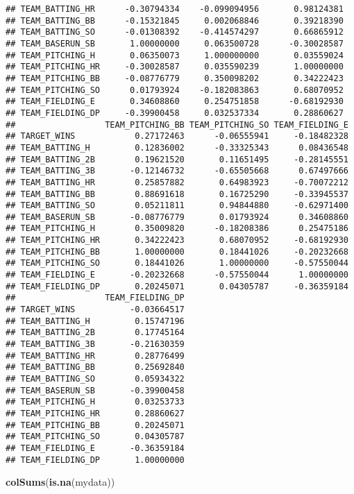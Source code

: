 \documentclass[
]{article}
\newenvironment{Shaded}{\begin{snugshade}}{\end{snugshade}}
\newcommand{\KeywordTok}[1]{\textcolor[rgb]{0.13,0.29,0.53}{\textbf{#1}}}
\newcommand{\NormalTok}[1]{#1}
\begin{document}
\begin{verbatim}
## TEAM_BATTING_HR      -0.30794334    -0.099094956       0.98124381
## TEAM_BATTING_BB      -0.15321845     0.002068846       0.39218390
## TEAM_BATTING_SO      -0.01308392    -0.414574297       0.66865912
## TEAM_BASERUN_SB       1.00000000     0.063500728      -0.30028587
## TEAM_PITCHING_H       0.06350073     1.000000000       0.03559024
## TEAM_PITCHING_HR     -0.30028587     0.035590239       1.00000000
## TEAM_PITCHING_BB     -0.08776779     0.350098202       0.34222423
## TEAM_PITCHING_SO      0.01793924    -0.182083863       0.68070952
## TEAM_FIELDING_E       0.34608860     0.254751858      -0.68192930
## TEAM_FIELDING_DP     -0.39900458     0.032537334       0.28860627
##                  TEAM_PITCHING_BB TEAM_PITCHING_SO TEAM_FIELDING_E
## TARGET_WINS            0.27172463      -0.06555941     -0.18482328
## TEAM_BATTING_H         0.12836002      -0.33325343      0.08436548
## TEAM_BATTING_2B        0.19621520       0.11651495     -0.28145551
## TEAM_BATTING_3B       -0.12146732      -0.65505668      0.67497666
## TEAM_BATTING_HR        0.25857882       0.64983923     -0.70072212
## TEAM_BATTING_BB        0.88691618       0.16725290     -0.33945537
## TEAM_BATTING_SO        0.05211811       0.94844880     -0.62971400
## TEAM_BASERUN_SB       -0.08776779       0.01793924      0.34608860
## TEAM_PITCHING_H        0.35009820      -0.18208386      0.25475186
## TEAM_PITCHING_HR       0.34222423       0.68070952     -0.68192930
## TEAM_PITCHING_BB       1.00000000       0.18441026     -0.20232668
## TEAM_PITCHING_SO       0.18441026       1.00000000     -0.57550044
## TEAM_FIELDING_E       -0.20232668      -0.57550044      1.00000000
## TEAM_FIELDING_DP       0.20245071       0.04305787     -0.36359184
##                  TEAM_FIELDING_DP
## TARGET_WINS           -0.03664517
## TEAM_BATTING_H         0.15747196
## TEAM_BATTING_2B        0.17745164
## TEAM_BATTING_3B       -0.21630359
## TEAM_BATTING_HR        0.28776499
## TEAM_BATTING_BB        0.25692840
## TEAM_BATTING_SO        0.05934322
## TEAM_BASERUN_SB       -0.39900458
## TEAM_PITCHING_H        0.03253733
## TEAM_PITCHING_HR       0.28860627
## TEAM_PITCHING_BB       0.20245071
## TEAM_PITCHING_SO       0.04305787
## TEAM_FIELDING_E       -0.36359184
## TEAM_FIELDING_DP       1.00000000
\end{verbatim}

\begin{Shaded}
\begin{Highlighting}[]
\KeywordTok{colSums}\NormalTok{(}\KeywordTok{is.na}\NormalTok{(mydata))}
\end{Highlighting}
\end{Shaded}
\end{document}
